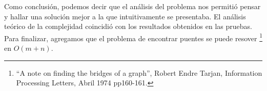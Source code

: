 Como conclusión, podemos decir que el análisis del problema nos permitió pensar y hallar una solución mejor a la que intuitivamente se presentaba. El análisis teórico de la complejidad 
coincidió con los resultados obtenidos en las pruebas. Para finalizar, agregamos que el problema de encontrar puentes se puede resover
\footnote{``A note on finding the bridges of a graph'', Robert Endre Tarjan, Information Processing Letters, Abril 1974 pp160-161.} en $O(m+n)$.